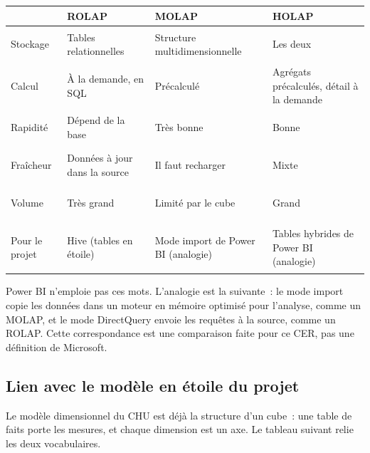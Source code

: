 \begin{center}
\small
\begin{tabularx}{\textwidth}{>{\bfseries\raggedright\arraybackslash}p{2cm} >{\raggedright\arraybackslash}X >{\raggedright\arraybackslash}X >{\raggedright\arraybackslash}X}
\toprule
 & ROLAP & MOLAP & HOLAP \\
\midrule
Stockage & Tables relationnelles & Structure multidimensionnelle & Les deux \\
Calcul & À la demande, en SQL & Précalculé & Agrégats précalculés, détail à la demande \\
Rapidité & Dépend de la base & Très bonne & Bonne \\
Fraîcheur & Données à jour dans la source & Il faut recharger & Mixte \\
Volume & Très grand & Limité par le cube & Grand \\
Pour le projet & Hive (tables en étoile) & Mode import de Power BI (analogie) & Tables hybrides de Power BI (analogie) \\
\bottomrule
\end{tabularx}
\end{center}

\noindent Power BI n'emploie pas ces mots. L'analogie est la suivante~: le mode import copie les données dans un moteur en mémoire optimisé pour l'analyse, comme un MOLAP, et le mode DirectQuery envoie les requêtes à la source, comme un ROLAP. Cette correspondance est une comparaison faite pour ce CER, pas une définition de Microsoft.

\subsection{Lien avec le modèle en étoile du projet}

\noindent Le modèle dimensionnel du CHU est déjà la structure d'un cube~: une table de faits porte les mesures, et chaque dimension est un axe. Le tableau suivant relie les deux vocabulaires.

